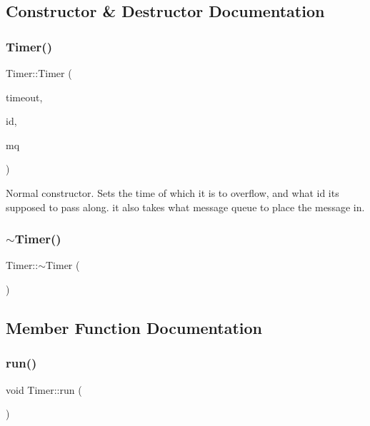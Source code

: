 \subsection{Constructor \& Destructor Documentation}
\mbox{\label{class_timer_a430e1b903802ec44b560a56dad510751}} 
\subsubsection{\texorpdfstring{Timer()}{Timer()}}
{\footnotesize\ttfamily Timer\+::\+Timer (\begin{DoxyParamCaption}\item[{unsigned long}]{timeout,  }\item[{unsigned long}]{id,  }\item[{osapi\+::\+Msg\+Queue $\ast$}]{mq }\end{DoxyParamCaption})}

Normal constructor. Sets the time of which it is to overflow, and what id it\textquotesingle{}s supposed to pass along. it also takes what message queue to place the message in. \mbox{\label{class_timer_a14fa469c4c295c5fa6e66a4ad1092146}} 
\subsubsection{\texorpdfstring{$\sim$\+Timer()}{~Timer()}}
{\footnotesize\ttfamily Timer\+::$\sim$\+Timer (\begin{DoxyParamCaption}{ }\end{DoxyParamCaption})\hspace{0.3cm}{\ttfamily [virtual]}}



\subsection{Member Function Documentation}
\mbox{\label{class_timer_a1323444ebd7f2c1407518a03a193b5f4}} 
\subsubsection{\texorpdfstring{run()}{run()}}
{\footnotesize\ttfamily void Timer\+::run (\begin{DoxyParamCaption}{ }\end{DoxyParamCaption})\hspace{0.3cm}{\ttfamily [private]}}



